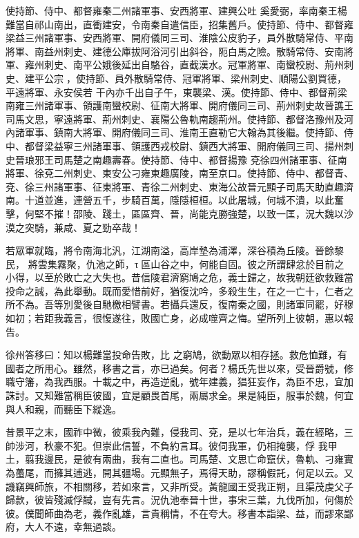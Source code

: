\begin{pinyinscope}
 使持節、侍中、都督雍秦二州諸軍事、安西將軍、建興公吐
 奚愛弼，率南秦王楊難當自祁山南出，直衝建安，令南秦自遣信臣，招集舊戶。使持節、侍中、都督雍梁益三州諸軍事、安西將軍、開府儀同三司、淮陰公皮豹子，員外散騎常侍、平南將軍、南益州刺史、建德公庫拔阿浴河引出斜谷，阨白馬之險。散騎常侍、安南將軍、雍州刺史、南平公娥後延出自駱谷，直截漢水。冠軍將軍、南蠻校尉、荊州刺史、建平公宗𦋎，使持節、員外散騎常侍、冠軍將軍、梁州刺史、順陽公劉買德，平遠將軍、永安侯若
 干內亦千出自子午，東襲梁、漢。使持節、侍中、都督荊梁南雍三州諸軍事、領護南蠻校尉、征南大將軍、開府儀同三司、荊州刺史故晉譙王司馬文思，寧遠將軍、荊州刺史、襄陽公魯軌南趨荊州。使持節、都督洛豫州及河內諸軍事、鎮南大將軍、開府儀同三司、淮南王直勒它大翰為其後繼。使持節、侍中、都督梁益寧三州諸軍事、領護西戎校尉、鎮西大將軍、開府儀同三司、揚州刺史晉琅邪王司馬楚之南趣壽春。使持節、侍中、都督揚豫
 兗徐四州諸軍事、征南將軍、徐兗二州刺史、東安公刁雍東趣廣陵，南至京口。使持節、侍中、都督青、兗、徐三州諸軍事、征東將軍、青徐二州刺史、東海公故晉元顯子司馬天助直趣濟南。十道並進，連營五千，步騎百萬，隱隱桓桓。以此屠城，何城不潰，以此奮擊，何堅不摧！邵陵、踐土，區區齊、晉，尚能克勝強楚，以致一匡，況大魏以沙漠之突騎，兼咸、夏之勁卒哉！



 若眾軍就臨，將令南海北汎，江湖南溢，高岸墊為浦澤，深谷積為丘陵。晉餘黎民，
 將雲集霧聚，仇池之師，τ區山谷之中，何能自固。彼之所謂肆忿於目前之小得，以至於敗亡之大失也。昔信陵君濟窮鳩之危，義士歸之，故我朝廷欲救難當投命之誠，為此舉動。既而愛惜前好，猶復沈吟，多殺生生，在之一亡十，仁者之所不為。吾等別愛後自馳檄相譬書。若攝兵還反，復南秦之國，則諸軍同罷，好穆如初；若距我義言，很愎遂往，敗國亡身，必成噬齊之悔。望所列上彼朝，惠以報告。



 徐州答移曰：知以楊難當投命告敗，比
 之窮鳩，欲動眾以相存拯。救危恤難，有國者之所用心。雖然，移書之言，亦已過矣。何者？楊氏先世以來，受晉爵號，修職守籓，為我西服。十載之中，再造逆亂，號年建義，猖狂妄作，為臣不忠，宜加誅討。又知難當稱臣彼國，宜是顧畏首尾，兩屬求全。果是純臣，服事於魏，何宜與人和親，而聽臣下縱逸。



 昔景平之末，國祚中微，彼乘我內難，侵我司、兗，是以七年治兵，義在經略，三帥涉河，秋豪不犯。但崇此信誓，不負約言耳。彼伺我軍，仍相掩襲，俘
 我甲土，翦我邊民，是彼有兩曲，我有二直也。司馬楚、文思亡命竄伏，魯軌、刁雍實為蠆尾，而擁其逋逃，開其疆場。元顯無子，焉得天助，謬稱假託，何足以云。又譏竊興師旅，不相關移，若如來言，又非所受。黃龍國王受我正朔，且渠茂虔父子歸款，彼皆殘滅俘馘，豈有先言。況仇池奉晉十世，事宋三葉，九伐所加，何傷於彼。僕聞師曲為老，義作亂雄，言貴稱情，不在夸大。移書本詣梁、益，而謬來鄙府，大人不遠，幸無過談。




\end{pinyinscope}
